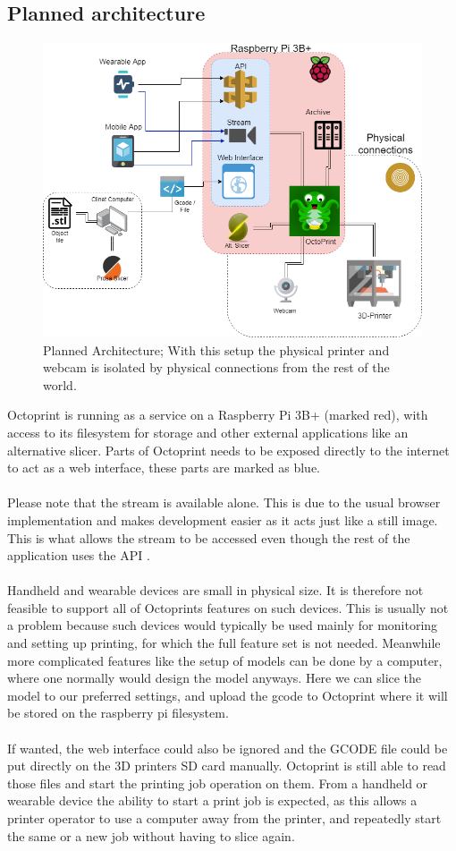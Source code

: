 \documentclass[a4paper, 12pt]{article}
\newcommand{\mysubsection}[1]{\subsection*{#1} \addcontentsline{toc}{subsection}{#1}}
\begin{document}
    \mysubsection{Planned architecture}
    \begin{figure}[h!]
        \includegraphics[scale=0.5]{figures/TizenPrint-architecture.png}
        \caption{Planned Architecture;
        With this setup the physical printer and webcam is isolated by physical
        connections from the rest of the world.}
    \end{figure}

    Octoprint is running as a service on a Raspberry Pi 3B+ (marked red), with access to its filesystem for storage and other
    external applications like an alternative slicer.
    Parts of Octoprint needs to be exposed directly to the internet to act as a web interface, these parts are marked as
    blue.
    \\\\
    Please note that the stream is available alone.
    This is due to the usual browser implementation and makes development easier as it acts just like a still image.
    This is what allows the stream to be accessed even though the rest of the application uses the API .
    \\\\
    Handheld and wearable devices are small in physical size.
    It is therefore not feasible to support all of Octoprints features on such devices.
    This is usually not a problem because such devices would typically be used mainly for monitoring and setting up printing,
    for which the full feature set is not needed.
    Meanwhile more complicated features like the setup of models can be done by a computer, where one normally would design
    the model anyways.
    Here we can slice the model to our preferred settings, and upload the gcode to Octoprint where it will be stored on
    the raspberry pi filesystem.
    \\\\
    If wanted, the web interface could also be ignored and the GCODE file could be put directly on the 3D printers SD card
    manually.
    Octoprint is still able to read those files and start the printing job operation on them.
    From a handheld or wearable device the ability to start a print job is expected, as this allows a printer operator
    to use a computer away from the printer, and repeatedly start the same or a new job without having to slice again.
\end{document}

